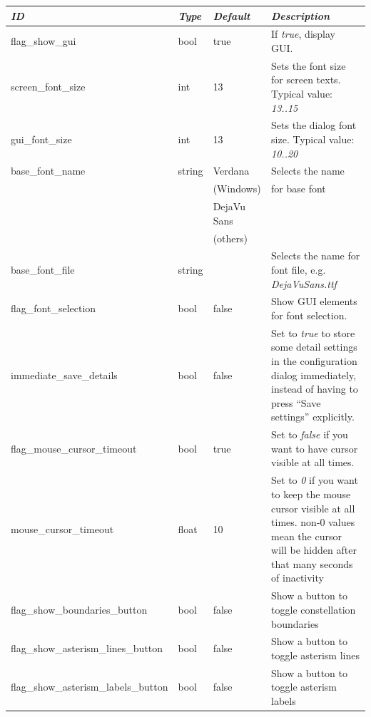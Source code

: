 \begin{longtable}{p{50mm}|l|l|p{55mm}}
\toprule
\emph{ID} & \emph{Type} & \emph{Default} & \emph{Description}\\\midrule
flag\_show\_gui                 & bool   & true & If \emph{true}, display GUI.\\\midrule
screen\_font\_size & int  & 13 & Sets the font size for screen texts. Typical value: \emph{13..15}\\%
gui\_font\_size  & int    & 13 & Sets the dialog font size. Typical value: \emph{10..20}\\%
base\_font\_name & string & Verdana     & Selects the name \\
                 &        & (Windows)            & for base font\\
                 &        & DejaVu Sans & \\
                 &        & (others)            & \\%
base\_font\_file                & string &      & Selects the name for font file, e.g. \emph{DejaVuSans.ttf}\\
flag\_font\_selection           & bool  & false & Show GUI elements for font selection.\\\midrule
immediate\_save\_details        & bool  & false & Set to \emph{true} to store some detail settings in the configuration dialog immediately, 
                                                  instead of having to press ``Save settings'' explicitly.\\\midrule
flag\_mouse\_cursor\_timeout    & bool  & true  & Set to \emph{false} if you want to have cursor visible at all times.\\%
mouse\_cursor\_timeout          & float & 10    & Set to \emph{0} if you want to keep the mouse cursor visible at all times. 
                                                  non-0 values mean the cursor will be hidden after that many seconds of inactivity\\\midrule
%
flag\_show\_boundaries\_button         & bool  & false & Show a button to toggle constellation boundaries\\
flag\_show\_asterism\_lines\_button    & bool  & false & Show a button to toggle asterism lines\\
flag\_show\_asterism\_labels\_button   & bool  & false & Show a button to toggle asterism labels\\

\end{longtable}
